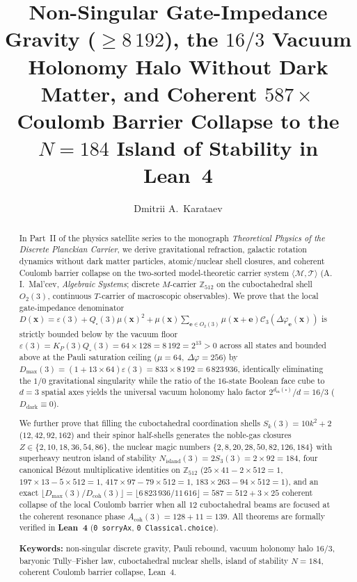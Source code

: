 \documentclass[11pt,a4paper]{article}
\title{\textbf{Non-Singular Gate-Impedance Gravity ($\ge 8\,192$), the $16/3$ Vacuum Holonomy Halo Without Dark Matter, and Coherent $587\times$ Coulomb Barrier Collapse to the $N = 184$ Island of Stability in Lean~4}}
\author{Dmitrii A.~Karataev}
\date{}
\theoremstyle{plain}
\theoremstyle{definition}
\begin{document}
\maketitle

\begin{abstract}
In Part~II of the physics satellite series to the monograph \emph{Theoretical Physics of the Discrete Planckian Carrier}, we derive gravitational refraction, galactic rotation dynamics without dark matter particles, atomic/nuclear shell closures, and coherent Coulomb barrier collapse on the two-sorted model-theoretic carrier system $\langle\mathcal{M},\mathcal{T}\rangle$ (A.\,I.~Mal'cev, \emph{Algebraic Systems}; discrete $M$-carrier $\mathbb{Z}_{512}$ on the cuboctahedral shell $O_2(3)$, continuous $T$-carrier of macroscopic observables). We prove that the local gate-impedance denominator $D(\mathbf{x}) = \varepsilon(3) + Q_\square(3)\mu(\mathbf{x})^2 + \mu(\mathbf{x})\sum_{\mathbf{e}\in O_2(3)}\mu(\mathbf{x}+\mathbf{e})\mathcal{C}_3(\Delta\varphi_{\mathbf{e}}(\mathbf{x}))$ is strictly bounded below by the vacuum floor $\varepsilon(3) = K_P(3)Q_\square(3) = 64\times 128 = 8\,192 = 2^{13} > 0$ across all states and bounded above at the Pauli saturation ceiling ($\mu=64,\ \Delta\varphi=256$) by $D_{\max}(3) = (1 + 13\times 64)\varepsilon(3) = 833\times 8\,192 = 6\,823\,936$, identically eliminating the $1/0$ gravitational singularity while the ratio of the $16$-state Boolean face cube to $d=3$ spatial axes yields the universal vacuum holonomy halo factor $2^{d_{\mathrm{in}}(\square)}/d = 16/3$ ($D_{\mathrm{dark}}\equiv 0$).

We further prove that filling the cuboctahedral coordination shells $S_k(3) = 10k^2 + 2$ ($12,42,92,162$) and their spinor half-shells generates the noble-gas closures $Z\in\{2,10,18,36,54,86\}$, the nuclear magic numbers $\{2,8,20,28,50,82,126,184\}$ with superheavy neutron island of stability $N_{\mathrm{island}}(3) = 2S_3(3) = 2\times 92 = 184$, four canonical B\'ezout multiplicative identities on $\mathbb{Z}_{512}$ ($25\times 41 - 2\times 512 = 1$, $197\times 13 - 5\times 512 = 1$, $417\times 97 - 79\times 512 = 1$, $183\times 263 - 94\times 512 = 1$), and an exact $\lfloor D_{\max}(3)/D_{\mathrm{coh}}(3)\rfloor = \lfloor 6\,823\,936/11\,616\rfloor = 587 = 512 + 3\times 25$ coherent collapse of the local Coulomb barrier when all $12$ cuboctahedral beams are focused at the coherent resonance phase $A_{\mathrm{coh}}(3) = 128 + 11 = 139$. All theorems are formally verified in \textbf{Lean~4} (\texttt{0 sorryAx}, \texttt{0 Classical.choice}).

\medskip\noindent
\textbf{Keywords:} non-singular discrete gravity, Pauli rebound, vacuum holonomy halo $16/3$, baryonic Tully--Fisher law, cuboctahedral nuclear shells, island of stability $N=184$, coherent Coulomb barrier collapse, Lean~4.
\end{abstract}
\end{document}
